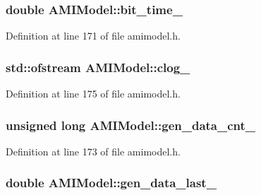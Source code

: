\subsubsection[{bit\+\_\+time\+\_\+}]{\setlength{\rightskip}{0pt plus 5cm}double A\+M\+I\+Model\+::bit\+\_\+time\+\_\+\hspace{0.3cm}{\ttfamily [protected]}}\label{class_a_m_i_model_ad0b6751b3b3a69fb8951fde0fcdf4f27}


Definition at line 171 of file amimodel.\+h.

\hypertarget{class_a_m_i_model_a9b1c44767e4e81c4dfcff9bc23907b6c}{}
\subsubsection[{clog\+\_\+}]{\setlength{\rightskip}{0pt plus 5cm}std\+::ofstream A\+M\+I\+Model\+::clog\+\_\+\hspace{0.3cm}{\ttfamily [protected]}}\label{class_a_m_i_model_a9b1c44767e4e81c4dfcff9bc23907b6c}


Definition at line 175 of file amimodel.\+h.

\hypertarget{class_a_m_i_model_ad8680b8371b9c476d046ff87d843fbe9}{}
\subsubsection[{gen\+\_\+data\+\_\+cnt\+\_\+}]{\setlength{\rightskip}{0pt plus 5cm}unsigned long A\+M\+I\+Model\+::gen\+\_\+data\+\_\+cnt\+\_\+\hspace{0.3cm}{\ttfamily [protected]}}\label{class_a_m_i_model_ad8680b8371b9c476d046ff87d843fbe9}


Definition at line 173 of file amimodel.\+h.

\hypertarget{class_a_m_i_model_aa9cacd5650a194a6f08552f2748bab7a}{}
\subsubsection[{gen\+\_\+data\+\_\+last\+\_\+}]{\setlength{\rightskip}{0pt plus 5cm}double A\+M\+I\+Model\+::gen\+\_\+data\+\_\+last\+\_\+\hspace{0.3cm}{\ttfamily [protected]}}\label{class_a_m_i_model_aa9cacd5650a194a6f08552f2748bab7a}


